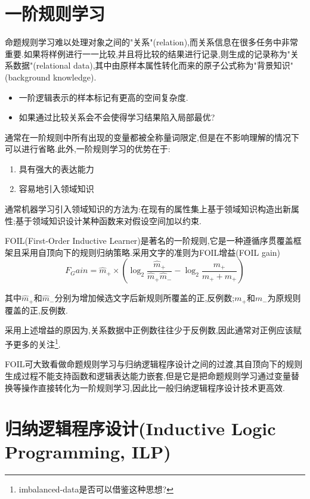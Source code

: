 \section{一阶规则学习}

命题规则学习难以处理对象之间的"关系"(relation),而关系信息在很多任务中非常重要.如果将样例进行一一比较,并且将比较的结果进行记录,则生成的记录称为"关系数据"(relational data),其中由原样本属性转化而来的原子公式称为"背景知识"(background knowledge).
\begin{itemize}
\item 一阶逻辑表示的样本标记有更高的空间复杂度.
\item 如果通过比较关系会不会使得学习结果陷入局部最优?
\end{itemize}

通常在一阶规则中所有出现的变量都被全称量词限定,但是在不影响理解的情况下可以进行省略.此外,一阶规则学习的优势在于:
\begin{enumerate}
\item 具有强大的表达能力
\item 容易地引入领域知识
\end{enumerate}

通常机器学习引入领域知识的方法为:在现有的属性集上基于领域知识构造出新属性;基于领域知识设计某种函数来对假设空间加以约束.

FOIL(First-Order Inductive Learner)是著名的一阶规则,它是一种遵循序贯覆盖框架且采用自顶向下的规则归纳策略.采用文字的准则为FOIL增益(FOIL gain)
\begin{equation}
F_Gain=\hat m_+\times(\log_2\frac{\hat m_+}{\hat m_+\hat m_-}-\log_2\frac{m_+}{m_++m_+})
\end{equation}

其中$\hat m_+$和$\hat m_-$分别为增加候选文字后新规则所覆盖的正,反例数;$m_+$和$m_-$为原规则覆盖的正,反例数.

采用上述增益的原因为,关系数据中正例数往往少于反例数,因此通常对正例应该赋予更多的关注\footnote{imbalanced-data是否可以借鉴这种思想?}.

FOIL可大致看做命题规则学习与归纳逻辑程序设计之间的过渡,其自顶向下的规则生成过程不能支持函数和逻辑表达能力嵌套,但是它是把命题规则学习通过变量替换等操作直接转化为一阶规则学习,因此比一般归纳逻辑程序设计技术更高效.

\section{归纳逻辑程序设计(Inductive Logic Programming, ILP)}

